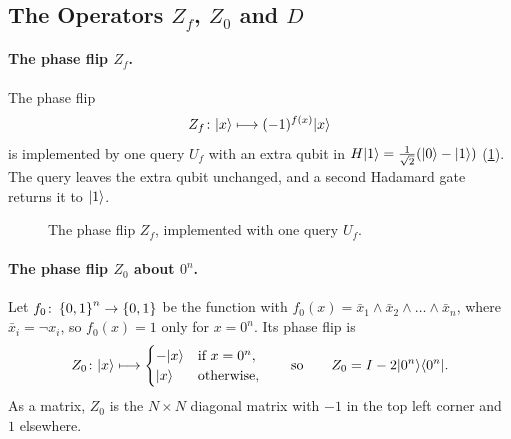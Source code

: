 \subsection{The Operators \texorpdfstring{$Z_f$}{Zf}, \texorpdfstring{$Z_0$}{Z0} and \texorpdfstring{$D$}{D}}

\paragraph{The phase flip $Z_f$.} The phase flip
\[Z_f \colon \lvert x \rangle \longmapsto (-1)^{f(x)} \lvert x \rangle\]
is implemented by one query $U_f$ with an extra qubit in $H\lvert 1 \rangle = \frac{1}{\sqrt{2}}(\lvert 0 \rangle - \lvert 1 \rangle)$
(\cref{fig:zf-1006}). The query leaves the extra qubit unchanged, and a second Hadamard gate returns
it to $\lvert 1 \rangle$.

\begin{figure}[ht]
    \centering
    \caption{The phase flip $Z_f$, implemented with one query $U_f$.}
    \label{fig:zf-1006}
\end{figure}

\paragraph{The phase flip $Z_0$ about $0^n$.} Let $f_0 \colon \left\lbrace0,1\right\rbrace^n \to \left\lbrace0,1\right\rbrace$ be the function
with $f_0(x) = \bar{x}_1 \wedge \bar{x}_2 \wedge \dots \wedge \bar{x}_n$, where $\bar{x}_i = \neg x_i$,
so $f_0(x) = 1$ only for $x = 0^n$. Its phase flip is
\[Z_0 \colon \lvert x \rangle \longmapsto \begin{cases} -\lvert x \rangle & \text{if } x = 0^n, \\ \lvert x \rangle & \text{otherwise}, \end{cases}
    \qquad \text{so} \qquad Z_0 = I - 2 \lvert 0^n \rangle\langle 0^n \rvert.\]
As a matrix, $Z_0$ is the $N \times N$ diagonal matrix with $-1$ in the top left corner and $1$
elsewhere.

